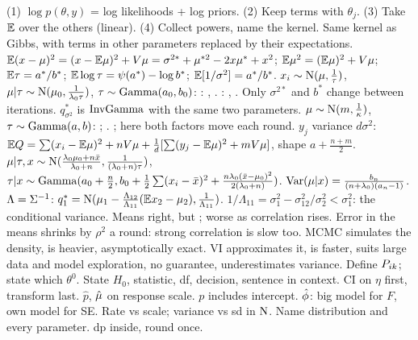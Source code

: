 \sk{} (1) $\log p(\theta,y)$ = log likelihoods + log priors. (2) Keep terms with $\theta_j$. (3) Take $\mathbb{E}$ over the others (linear). (4) Collect powers, name the kernel. Same kernel as Gibbs, with terms in other parameters replaced by their expectations.
\sk{} $\mathbb{E}(x-\mu)^2=(x-\mathbb{E}\mu)^2+V\mu=\sigma^{2*}+\mu^{*2}-2x\mu^*+x^2$; $\mathbb{E}\mu^2=(\mathbb{E}\mu)^2+V\mu$; $\mathbb{E}\tau=a^*/b^*$; $\mathbb{E}\log\tau=\psi(a^*)-\log b^*$; $\mathbb{E}[1/\sigma^2]=a^*/b^*$. 
\sk{} $x_i\sim\mathrm{N}(\mu,\frac1\tau)$, $\mu|\tau\sim\mathrm{N}(\mu_0,\frac1{\lambda_0\tau})$, $\tau\sim\mathrm{Gamma}(a_0,b_0)$:
\sk{}: , .
\sk{}: , .
\sk Only $\sigma^{2*}$ and $b^*$ change between iterations.  $q_{\sigma^2}^*$ is $\mathrm{InvGamma}$ with the same two parameters.
\sk{} $\mu\sim\mathrm{N}(m,\frac1\kappa)$, $\tau\sim\mathrm{Gamma}(a,b)$: ; . ; here both factors move each round.  $y_j$ variance $d\sigma^2$: $\mathbb{E} Q=\sum(x_i-\mathbb{E}\mu)^2+nV\mu+\frac1d[\sum(y_j-\mathbb{E}\mu)^2+mV\mu]$, shape $a+\frac{n+m}2$.
\sk{} $\mu|\tau,x\sim\mathrm{N}(\frac{\lambda_0\mu_0+n\bar x}{\lambda_0+n},\frac1{(\lambda_0+n)\tau})$, $\tau|x\sim\mathrm{Gamma}(a_0+\frac n2,b_0+\frac12\sum(x_i-\bar x)^2+\frac{n\lambda_0(\bar x-\mu_0)^2}{2(\lambda_0+n)})$. $\mathrm{Var}(\mu|x)=\frac{b_n}{(n+\lambda_0)(a_n-1)}$.
\sk{} $\Lambda=\Sigma^{-1}$: $q_1^*=\mathrm{N}(\mu_1-\frac{\Lambda_{12}}{\Lambda_{11}}(\mathbb{E} x_2-\mu_2),\frac1{\Lambda_{11}})$. $1/\Lambda_{11}=\sigma_1^2-\sigma_{12}^2/\sigma_2^2<\sigma_1^2$: the conditional variance. Means right, but ; worse as correlation rises. Error in the means shrinks by $\rho^2$ a round: strong correlation is slow too.
\bx
{} MCMC simulates the density, is heavier, asymptotically exact. VI approximates it, is faster, suits large data and model exploration, no guarantee, underestimates variance.
\li Define $P_{ik}$; state which $\theta^0$. \li State $H_0$, statistic, df, decision, sentence in context. \li CI on $\eta$ first, transform last. \li $\hat p$, $\hat{\mu}$ on response scale. \li $p$ includes intercept. \li $\hat{\phi}$: big model for $F$, own model for SE. \li Rate vs scale; variance vs sd in $\mathrm{N}$. \li Name distribution and every parameter.  dp inside, round once.
